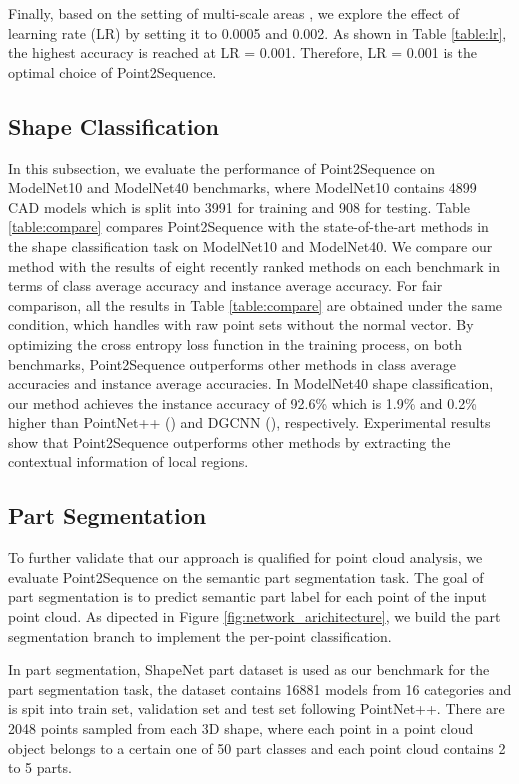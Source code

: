 \documentclass[letterpaper]{article}
\begin{document}
Finally, based on the setting of multi-scale areas , we explore the effect of learning rate (LR) by setting it to 0.0005 and 0.002.
As shown in Table \ref{table:lr}, the highest accuracy is reached at LR = 0.001.
Therefore, LR = 0.001 is the optimal choice of Point2Sequence.

\subsection{Shape Classification}
In this subsection, we evaluate the performance of Point2Sequence on ModelNet10 and ModelNet40 benchmarks, where
ModelNet10 contains 4899 CAD models which is split into 3991 for training and 908 for testing.
Table \ref{table:compare} compares Point2Sequence with the state-of-the-art methods in the shape classification task on ModelNet10 and ModelNet40.
We compare our method with the results of eight recently ranked methods on each benchmark in terms of class average accuracy and instance average accuracy.
For fair comparison, all the results in Table \ref{table:compare}  are obtained under the same condition, which handles with raw point sets without the normal vector.
By optimizing the cross entropy loss function in the training process, on both benchmarks, Point2Sequence outperforms other methods in class average accuracies and instance average accuracies.
In ModelNet40 shape classification, our method achieves the instance accuracy of 92.6\% which is 1.9\% and 0.2\% higher than PointNet++ (\citealt{qi2017pointnet++}) and DGCNN (\citealt{wang2018dynamic}), respectively.
Experimental results show that Point2Sequence outperforms other methods by extracting the contextual information of local regions.



\subsection{Part Segmentation}
To further validate that our approach is qualified for point cloud analysis, we evaluate Point2Sequence on the semantic part segmentation task.
The goal of part segmentation is to predict semantic part label for each point of the input point cloud.
As dipected in Figure \ref{fig:network_arichitecture}, we build the part segmentation branch to implement the per-point classification.

In part segmentation, ShapeNet part dataset is used as our benchmark for the part segmentation task, the dataset contains 16881 models from 16 categories and is spit into train set, validation set and test set following PointNet++.
There are 2048 points sampled from each 3D shape, where each point in a point cloud object belongs to a certain one of 50 part classes and each point cloud contains 2 to 5 parts.
\end{document}

